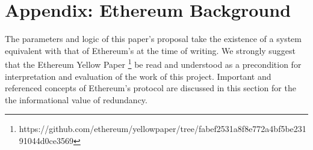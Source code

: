 \documentclass[11pt]{article}
\theoremstyle{plain}
\begin{document}








\pagebreak
\section{\normalsize{Appendix: Ethereum Background}}

The parameters and logic of this paper's proposal take the existence of a
system equivalent with that of Ethereum's at the time of writing.
We strongly suggest that the Ethereum Yellow Paper\nolinebreak
\footnote{https://github.com/ethereum/yellowpaper/tree/fabef2531a8f8e772a4bf5be23191044d0ce3569}
be read and understood as a precondition for interpretation and evaluation
of the work of this project.
Important and referenced concepts of Ethereum's protocol are discussed in this 
section for the the informational value of redundancy.
\end{document}

